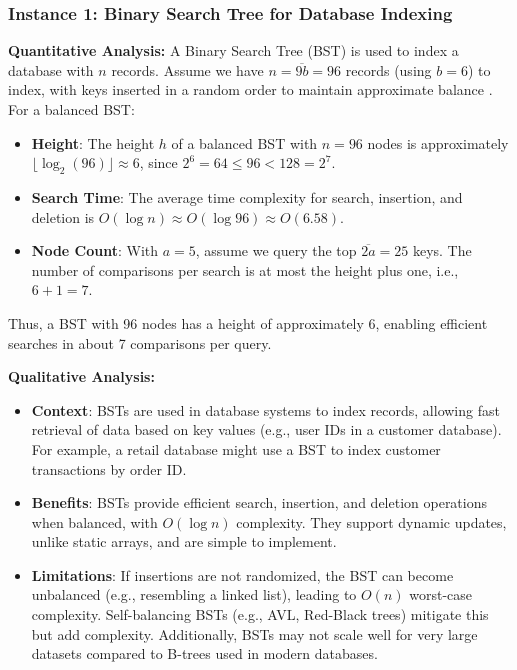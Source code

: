 \documentclass[12pt, a4paper, twoside]{report} %
\begin{document}
\subsubsection*{Instance 1: Binary Search Tree for Database Indexing}

\textbf{Quantitative Analysis:}
A Binary Search Tree (BST) is used to index a database with \( n \) records. Assume we have \( n = \overline{9b} = 96 \) records (using \( b = 6 \)) to index, with keys inserted in a random order to maintain approximate balance \citep{rosen2019}. For a balanced BST:
\begin{itemize}
  \item \textbf{Height}: The height \( h \) of a balanced BST with \( n = 96 \) nodes is approximately \( \lfloor \log_2(96) \rfloor \approx 6 \), since \( 2^6 = 64 \leq 96 < 128 = 2^7 \).
  \item \textbf{Search Time}: The average time complexity for search, insertion, and deletion is \( O(\log n) \approx O(\log 96) \approx O(6.58) \).
  \item \textbf{Node Count}: With \( a = 5 \), assume we query the top \( \overline{2a} = 25 \) keys. The number of comparisons per search is at most the height plus one, i.e., \( 6 + 1 = 7 \).
\end{itemize}
Thus, a BST with 96 nodes has a height of approximately 6, enabling efficient searches in about 7 comparisons per query.

\textbf{Qualitative Analysis:}
\begin{itemize}
  \item \textbf{Context}: BSTs are used in database systems to index records, allowing fast retrieval of data based on key values (e.g., user IDs in a customer database). For example, a retail database might use a BST to index customer transactions by order ID.
  \item \textbf{Benefits}: BSTs provide efficient search, insertion, and deletion operations when balanced, with \( O(\log n) \) complexity. They support dynamic updates, unlike static arrays, and are simple to implement.
  \item \textbf{Limitations}: If insertions are not randomized, the BST can become unbalanced (e.g., resembling a linked list), leading to \( O(n) \) worst-case complexity. Self-balancing BSTs (e.g., AVL, Red-Black trees) mitigate this but add complexity. Additionally, BSTs may not scale well for very large datasets compared to B-trees used in modern databases.
\end{itemize}
\end{document}
